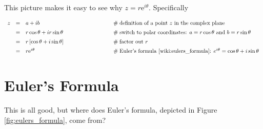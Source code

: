 \documentclass{article}
\theoremstyle{definition}
\begin{document}
\bigskip
\noindent
This picture makes it easy to see why $z = r \mathrm{e}^{i
\theta}$. Specifically

\begin{equation*}
\begin{array}{lllll}
z
&=& a + ib
                &\qquad \qquad \qquad \qquad \mathrel{\#}
					\text{definition of a point $z$ in the complex plane} \\ 
[5pt]
&=&  r \cos \theta + i r \sin \theta
                &\qquad \qquad \qquad \qquad \mathrel{\#}
					\text{switch to polar coordinates: $a = r \cos
					\theta$ and $b = r \sin \theta$} \\ 
[5pt]
&=&  r \left [ \cos \theta +i \sin \theta \right ]
                &\qquad \qquad \qquad \qquad \mathrel{\#}
					\text{factor out  $r$} \\ 
[5pt]
&=& r \mathrm{e}^{i\theta}
                &\qquad \qquad \qquad \qquad \mathrel{\#}
					\text{Euler's formula \cite{wiki:eulers_formula}: }  
					e^{i\theta} = \cos \theta + i \sin \theta
\end{array}
\end{equation*}


\section{Euler's Formula}

\medskip
This is all good, but where does Euler's formula, depicted in
Figure \ref{fig:eulers_formula}, come from?
\end{document}
